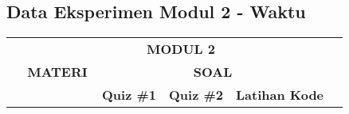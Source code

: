 \begin{landscape}
\chapter{Data Eksperimen Modul 2 - Waktu} \label{appendix:data-modul2-waktu}
\scriptsize
  \begin{longtable}[c]{|l|llllllllll|}
  \hline
  \rowcolor[HTML]{C0C0C0} 
  \multicolumn{1}{|c|}{\cellcolor[HTML]{C0C0C0}}                                  & \multicolumn{10}{c|}{\cellcolor[HTML]{C0C0C0}\textbf{MODUL 2}}                                                                                                                                                                                                                                                                                                                                                                                                                                                                                                                                                                                                                                                                                                                                                                    \\ \cline{2-11} 
  \rowcolor[HTML]{C0C0C0} 
  \multicolumn{1}{|c|}{\cellcolor[HTML]{C0C0C0}}                                  & \multicolumn{6}{c|}{\cellcolor[HTML]{C0C0C0}\textbf{MATERI}}                                                                                                                                                                                                                                                                                                                                                                                                                                                                      & \multicolumn{3}{c|}{\cellcolor[HTML]{C0C0C0}\textbf{SOAL}}                                                                                                                                           & \multicolumn{1}{c|}{\cellcolor[HTML]{C0C0C0}}                                          \\ \cline{2-10}
  \rowcolor[HTML]{C0C0C0} 
  \multicolumn{1}{|c|}{\cellcolor[HTML]{C0C0C0}}                                  & \multicolumn{1}{c|}{\cellcolor[HTML]{C0C0C0}}                                       & \multicolumn{1}{c|}{\cellcolor[HTML]{C0C0C0}}                                       & \multicolumn{1}{c|}{\cellcolor[HTML]{C0C0C0}}                                       & \multicolumn{1}{c|}{\cellcolor[HTML]{C0C0C0}}                                       & \multicolumn{1}{c|}{\cellcolor[HTML]{C0C0C0}}                                       & \multicolumn{1}{c|}{\cellcolor[HTML]{C0C0C0}}                                       & \multicolumn{1}{c|}{\cellcolor[HTML]{C0C0C0}\textbf{Quiz \#1}} & \multicolumn{1}{c|}{\cellcolor[HTML]{C0C0C0}\textbf{Quiz \#2}} & \multicolumn{1}{c|}{\cellcolor[HTML]{C0C0C0}\textbf{Latihan Kode}} & \multicolumn{1}{c|}{\cellcolor[HTML]{C0C0C0}}                                          \\ \cline{8-10}

\end{longtable}
\end{landscape}

